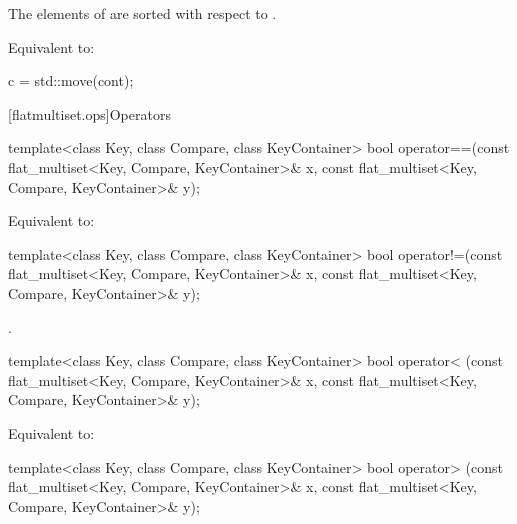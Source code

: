 \begin{codeblock}
\begin{codeblock}
\begin{codeblock}
\begin{addedblock}
\begin{itemdescr}
\pnum \expects
The elements of  are sorted with respect to .

\pnum
\effects Equivalent to:
\begin{codeblock}
c = std::move(cont);
\end{codeblock}
\end{itemdescr}

[flatmultiset.ops]{Operators}

%
\begin{itemdecl}
template<class Key, class Compare, class KeyContainer>
  bool operator==(const flat_multiset<Key, Compare, KeyContainer>& x,
                  const flat_multiset<Key, Compare, KeyContainer>& y);
\end{itemdecl}

\begin{itemdescr}
\pnum
\effects Equivalent to:
\end{itemdescr}

%
\begin{itemdecl}
template<class Key, class Compare, class KeyContainer>
  bool operator!=(const flat_multiset<Key, Compare, KeyContainer>& x,
                  const flat_multiset<Key, Compare, KeyContainer>& y);
\end{itemdecl}

\begin{itemdescr}
\pnum \returns {}.
\end{itemdescr}

%
\begin{itemdecl}
template<class Key, class Compare, class KeyContainer>
  bool operator< (const flat_multiset<Key, Compare, KeyContainer>& x,
                  const flat_multiset<Key, Compare, KeyContainer>& y);
\end{itemdecl}

\begin{itemdescr}
\pnum
\effects Equivalent to:
\end{itemdescr}

%
\begin{itemdecl}
template<class Key, class Compare, class KeyContainer>
  bool operator> (const flat_multiset<Key, Compare, KeyContainer>& x,
                  const flat_multiset<Key, Compare, KeyContainer>& y);
\end{itemdecl}


\end{addedblock}
\end{codeblock}
\end{codeblock}
\end{codeblock}
